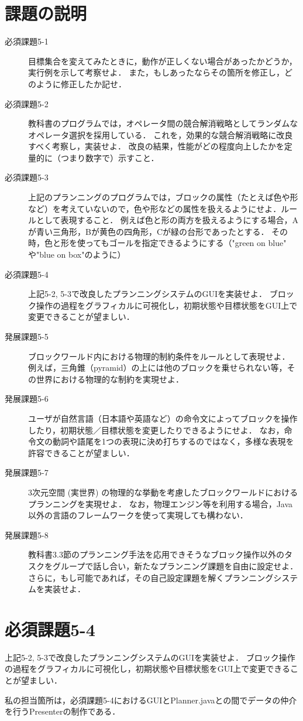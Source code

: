 \documentclass[12pt]{jarticle}
\begin{document}
\section{課題の説明}
\begin{description}
\item[必須課題5-1] 目標集合を変えてみたときに，動作が正しくない場合があったかどうか，実行例を示して考察せよ．
また，もしあったならその箇所を修正し，どのように修正したか記せ．
\item[必須課題5-2] 教科書のプログラムでは，オペレータ間の競合解消戦略としてランダムなオペレータ選択を採用している．
これを，効果的な競合解消戦略に改良すべく考察し，実装せよ．
改良の結果，性能がどの程度向上したかを定量的に（つまり数字で）示すこと．
\item[必須課題5-3] 上記のプランニングのプログラムでは，ブロックの属性（たとえば色や形など）を考えていないので，色や形などの属性を扱えるようにせよ．ルールとして表現すること．
例えば色と形の両方を扱えるようにする場合，Aが青い三角形，Bが黄色の四角形，Cが緑の台形であったとする．
その時，色と形を使ってもゴールを指定できるようにする（"green on blue" や"blue on box"のように）
\item[必須課題5-4] 上記5-2, 5-3で改良したプランニングシステムのGUIを実装せよ．
ブロック操作の過程をグラフィカルに可視化し，初期状態や目標状態をGUI上で変更できることが望ましい．
\item[発展課題5-5] ブロックワールド内における物理的制約条件をルールとして表現せよ．
例えば，三角錐（pyramid）の上には他のブロックを乗せられない等，その世界における物理的な制約を実現せよ．
\item[発展課題5-6] ユーザが自然言語（日本語や英語など）の命令文によってブロックを操作したり，初期状態／目標状態を変更したりできるようにせよ．
なお，命令文の動詞や語尾を1つの表現に決め打ちするのではなく，多様な表現を許容できることが望ましい．
\item[発展課題5-7] 3次元空間 (実世界) の物理的な挙動を考慮したブロックワールドにおけるプランニングを実現せよ．
なお，物理エンジン等を利用する場合，Java以外の言語のフレームワークを使って実現しても構わない．
\item[発展課題5-8] 教科書3.3節のプランニング手法を応用できそうなブロック操作以外のタスクをグループで話し合い，新たなプランニング課題を自由に設定せよ．
さらに，もし可能であれば，その自己設定課題を解くプランニングシステムを実装せよ．
\end{description}

\section{必須課題5-4}
\begin{screen}
上記5-2, 5-3で改良したプランニングシステムのGUIを実装せよ．
ブロック操作の過程をグラフィカルに可視化し，初期状態や目標状態をGUI上で変更できることが望ましい．
\end{screen}
私の担当箇所は，必須課題5-4におけるGUIとPlanner.javaとの間でデータの仲介を行うPresenterの制作である．
\end{document}
